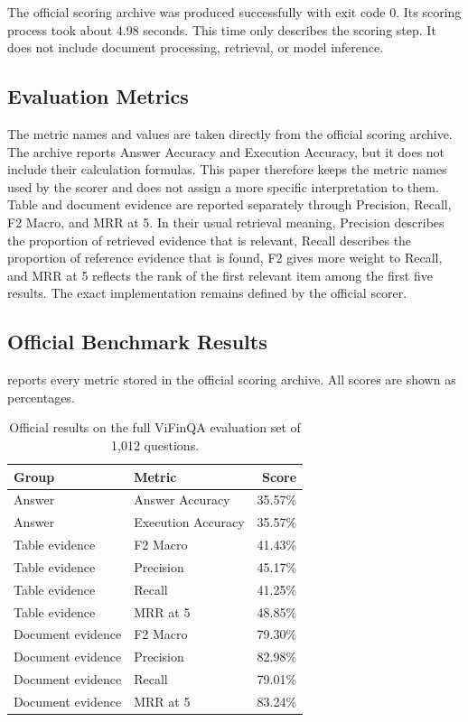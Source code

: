 \documentclass[10pt,journal,compsoc]{IEEEtran}
\begin{document}
The official scoring archive was produced successfully with exit code 0. Its scoring process took about 4.98 seconds. This time only describes the scoring step. It does not include document processing, retrieval, or model inference.

\subsection{Evaluation Metrics}

The metric names and values are taken directly from the official scoring archive. The archive reports Answer Accuracy and Execution Accuracy, but it does not include their calculation formulas. This paper therefore keeps the metric names used by the scorer and does not assign a more specific interpretation to them. Table and document evidence are reported separately through Precision, Recall, F2 Macro, and MRR at 5. In their usual retrieval meaning, Precision describes the proportion of retrieved evidence that is relevant, Recall describes the proportion of reference evidence that is found, F2 gives more weight to Recall, and MRR at 5 reflects the rank of the first relevant item among the first five results. The exact implementation remains defined by the official scorer.

\subsection{Official Benchmark Results}

 reports every metric stored in the official scoring archive. All scores are shown as percentages.

\begin{table}[!t]
\centering
\caption{Official results on the full ViFinQA evaluation set of 1,012 questions.}
\label{tab:official_results}
\begin{tabular}{llr}
\toprule
\textbf{Group} & \textbf{Metric} & \textbf{Score} \\
\midrule
Answer & Answer Accuracy & 35.57\% \\
Answer & Execution Accuracy & 35.57\% \\
Table evidence & F2 Macro & 41.43\% \\
Table evidence & Precision & 45.17\% \\
Table evidence & Recall & 41.25\% \\
Table evidence & MRR at 5 & 48.85\% \\
Document evidence & F2 Macro & 79.30\% \\
Document evidence & Precision & 82.98\% \\
Document evidence & Recall & 79.01\% \\
Document evidence & MRR at 5 & 83.24\% \\
\bottomrule
\end{tabular}
\end{table}
\end{document}

